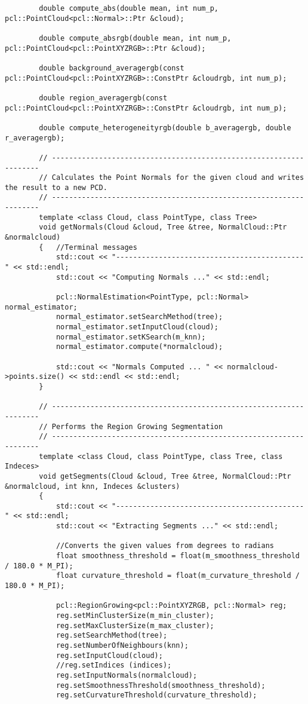 \begin{lstlisting}
		double compute_abs(double mean, int num_p, pcl::PointCloud<pcl::Normal>::Ptr &cloud);

		double compute_absrgb(double mean, int num_p, pcl::PointCloud<pcl::PointXYZRGB>::Ptr &cloud);

		double background_averagergb(const pcl::PointCloud<pcl::PointXYZRGB>::ConstPtr &cloudrgb, int num_p);

		double region_averagergb(const pcl::PointCloud<pcl::PointXYZRGB>::ConstPtr &cloudrgb, int num_p);

		double compute_heterogeneityrgb(double b_averagergb, double r_averagergb);

		// -------------------------------------------------------------------
		// Calculates the Point Normals for the given cloud and writes the result to a new PCD.
		// -------------------------------------------------------------------
		template <class Cloud, class PointType, class Tree>
		void getNormals(Cloud &cloud, Tree &tree, NormalCloud::Ptr &normalcloud)
		{	//Terminal messages
			std::cout << "--------------------------------------------" << std::endl;
			std::cout << "Computing Normals ..." << std::endl;

			pcl::NormalEstimation<PointType, pcl::Normal> normal_estimator;
			normal_estimator.setSearchMethod(tree);
			normal_estimator.setInputCloud(cloud);
			normal_estimator.setKSearch(m_knn);
			normal_estimator.compute(*normalcloud);

			std::cout << "Normals Computed ... " << normalcloud->points.size() << std::endl << std::endl;
		}

		// -------------------------------------------------------------------
		// Performs the Region Growing Segmentation
		// -------------------------------------------------------------------
		template <class Cloud, class PointType, class Tree, class Indeces>
		void getSegments(Cloud &cloud, Tree &tree, NormalCloud::Ptr &normalcloud, int knn, Indeces &clusters)
		{
			std::cout << "--------------------------------------------" << std::endl;
			std::cout << "Extracting Segments ..." << std::endl;
			
			//Converts the given values from degrees to radians
			float smoothness_threshold = float(m_smoothness_threshold / 180.0 * M_PI);
			float curvature_threshold = float(m_curvature_threshold / 180.0 * M_PI);

			pcl::RegionGrowing<pcl::PointXYZRGB, pcl::Normal> reg;
			reg.setMinClusterSize(m_min_cluster);
			reg.setMaxClusterSize(m_max_cluster);
			reg.setSearchMethod(tree);
			reg.setNumberOfNeighbours(knn);
			reg.setInputCloud(cloud);
			//reg.setIndices (indices);
			reg.setInputNormals(normalcloud);
			reg.setSmoothnessThreshold(smoothness_threshold);
			reg.setCurvatureThreshold(curvature_threshold);


\end{lstlisting}
